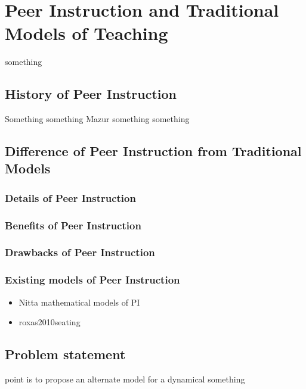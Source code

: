 \chapter{Peer Instruction and Traditional Models of Teaching}

\hspace{\parindent} something
\section{History of Peer Instruction}
\hspace{\parindent} Something something Mazur something something
\newpage
\section{Difference of Peer Instruction from Traditional Models}
\subsection{Details of Peer Instruction}
\subsection{Benefits of Peer Instruction}
\subsection{Drawbacks of Peer Instruction}
\subsection{Existing models of Peer Instruction}
\begin{itemize}
    \item Nitta mathematical models of PI \cite{nitta2019mathematical}
    \item roxas2010seating \cite{roxas2010seating}
\end{itemize}
\section{Problem statement}
point is to propose an alternate model for a dynamical something
